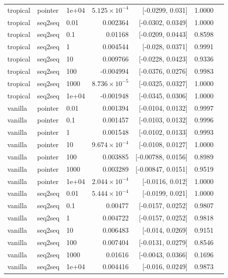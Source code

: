 \documentclass[10pt]{article}
\begin{document}
{\begin{longtable}{lllrrrl}
tropical & pointer & 1e+04 & $5.125\times10^{-4}$ & [-0.0299, 0.031] & 1.0000 & \\
tropical & seq2seq & 0.01 & 0.002364 & [-0.0302, 0.0349] & 1.0000 & \\
tropical & seq2seq & 0.1 & 0.01168 & [-0.0209, 0.0443] & 0.8598 & \\
tropical & seq2seq & 1 & 0.004544 & [-0.028, 0.0371] & 0.9991 & \\
tropical & seq2seq & 10 & 0.009766 & [-0.0228, 0.0423] & 0.9336 & \\
tropical & seq2seq & 100 & -0.004994 & [-0.0376, 0.0276] & 0.9983 & \\
tropical & seq2seq & 1000 & $8.736\times10^{-5}$ & [-0.0325, 0.0327] & 1.0000 & \\
tropical & seq2seq & 1e+04 & -0.001948 & [-0.0345, 0.0306] & 1.0000 & \\
vanilla & pointer & 0.01 & 0.001394 & [-0.0104, 0.0132] & 0.9997 & \\
vanilla & pointer & 0.1 & 0.001457 & [-0.0103, 0.0132] & 0.9996 & \\
vanilla & pointer & 1 & 0.001548 & [-0.0102, 0.0133] & 0.9993 & \\
vanilla & pointer & 10 & $9.674\times10^{-4}$ & [-0.0108, 0.0127] & 1.0000 & \\
vanilla & pointer & 100 & 0.003885 & [-0.00788, 0.0156] & 0.8989 & \\
vanilla & pointer & 1000 & 0.003289 & [-0.00847, 0.0151] & 0.9519 & \\
vanilla & pointer & 1e+04 & $2.044\times10^{-4}$ & [-0.0116, 0.012] & 1.0000 & \\
vanilla & seq2seq & 0.01 & $5.444\times10^{-4}$ & [-0.0199, 0.021] & 1.0000 & \\
vanilla & seq2seq & 0.1 & 0.00477 & [-0.0157, 0.0252] & 0.9807 & \\
vanilla & seq2seq & 1 & 0.004722 & [-0.0157, 0.0252] & 0.9818 & \\
vanilla & seq2seq & 10 & 0.006483 & [-0.014, 0.0269] & 0.9151 & \\
vanilla & seq2seq & 100 & 0.007404 & [-0.0131, 0.0279] & 0.8546 & \\
vanilla & seq2seq & 1000 & 0.01616 & [-0.0043, 0.0366] & 0.1696 & \\
vanilla & seq2seq & 1e+04 & 0.004416 & [-0.016, 0.0249] & 0.9873 & \\
\bottomrule
\end{longtable}
}
\end{document}
